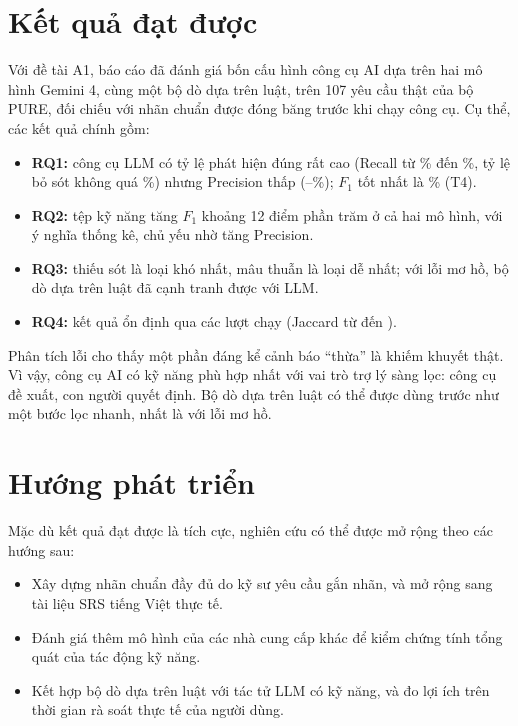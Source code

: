 \documentclass[12pt,a4paper]{report}
\begin{document}
\section{Kết quả đạt được}
Với đề tài A1, báo cáo đã đánh giá bốn cấu hình công cụ AI dựa trên hai mô hình Gemini 4, cùng một bộ dò dựa trên luật, trên 107 yêu cầu thật của bộ PURE, đối chiếu với nhãn chuẩn được đóng băng trước khi chạy công cụ. Cụ thể, các kết quả chính gồm:
\begin{itemize}
  \item \textbf{RQ1:} công cụ LLM có tỷ lệ phát hiện đúng rất cao (Recall từ \numRTfour\% đến \numRTone\%, tỷ lệ bỏ sót không quá \numMissTfour\%) nhưng Precision thấp (\numPTone--\numPTfour\%); $F_1$ tốt nhất là \numFTfour\% (T4).
  \item \textbf{RQ2:} tệp kỹ năng tăng $F_1$ khoảng 12 điểm phần trăm ở cả hai mô hình, với ý nghĩa thống kê, chủ yếu nhờ tăng Precision.
  \item \textbf{RQ3:} thiếu sót là loại khó nhất, mâu thuẫn là loại dễ nhất; với lỗi mơ hồ, bộ dò dựa trên luật đã cạnh tranh được với LLM.
  \item \textbf{RQ4:} kết quả ổn định qua các lượt chạy (Jaccard từ \numJacTtwo{} đến \numJacTone).
\end{itemize}
Phân tích lỗi cho thấy một phần đáng kể cảnh báo ``thừa'' là khiếm khuyết thật. Vì vậy, công cụ AI có kỹ năng phù hợp nhất với vai trò trợ lý sàng lọc: công cụ đề xuất, con người quyết định. Bộ dò dựa trên luật có thể được dùng trước như một bước lọc nhanh, nhất là với lỗi mơ hồ.

\section{Hướng phát triển}
Mặc dù kết quả đạt được là tích cực, nghiên cứu có thể được mở rộng theo các hướng sau:
\begin{itemize}
  \item Xây dựng nhãn chuẩn đầy đủ do kỹ sư yêu cầu gắn nhãn, và mở rộng sang tài liệu SRS tiếng Việt thực tế.
  \item Đánh giá thêm mô hình của các nhà cung cấp khác để kiểm chứng tính tổng quát của tác động kỹ năng.
  \item Kết hợp bộ dò dựa trên luật với tác tử LLM có kỹ năng, và đo lợi ích trên thời gian rà soát thực tế của người dùng.
\end{itemize}

\end{document}
